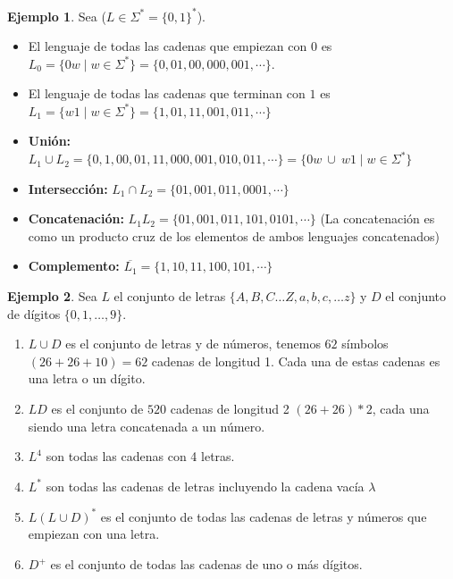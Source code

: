 \textbf{Ejemplo 1}. Sea ($L \in \Sigma^* = \{0,1\}^*$). 

\begin{itemize}
    \item El lenguaje de todas las cadenas que empiezan con $0$ es $L_0 = \{0w \mid w \in \Sigma^*\} = \{0,01,00, 000, 001, \cdots\}$.
    \item El lenguaje de todas las cadenas que terminan con $1$ es $L_1 = \{w1 \mid w \in \Sigma^*\} = \{1, 01, 11, 001, 011, \cdots\}$
\end{itemize}

\begin{itemize}
    \item \textbf{Unión:} $L_1 \cup L_2 = \{0,1,00, 01,11, 000, 001, 010, 011, \cdots\} = \{0w \ \cup \ w1 \mid w \in \Sigma^*\}$
    \item \textbf{Intersección:} $L_1 \cap L_2  = \{ 01, 001, 011, 0001, \cdots\} $
    \item \textbf{Concatenación:} $L_1L_2 = \{01,001,011,101,0101, \cdots\}$ (La concatenación es como un producto cruz de los elementos de ambos lenguajes concatenados)
    \item \textbf{Complemento:} $\overline{L_1} = \{1,10,11,100, 101, \cdots\}$
\end{itemize}
 
\textbf{Ejemplo 2}. Sea $L$ el conjunto de letras $\{A,B,C \dots Z, a,b,c, \dots z\}$ y $D$ el conjunto de dígitos $\{0,1, \dots , 9\}$.

\begin{enumerate}
    \item $L \cup D$ es el conjunto de letras y de números, tenemos $62$ símbolos $(26+26+10) = 62$ cadenas de longitud 1. Cada una de estas cadenas es una letra o un dígito. 
    \item $LD$ es el conjunto de $520$ cadenas de longitud 2 $(26 + 26)*2$, cada una siendo una letra concatenada a un número. 
    \item $L^4$ son todas las cadenas con 4 letras. 
    \item $L^*$ son todas las cadenas de letras incluyendo la cadena vacía $\lambda$
    \item $L(L \cup D)^*$ es el conjunto de todas las cadenas de letras y números que empiezan con una letra. 
    \item $D^{+}$ es el conjunto de todas las cadenas de uno o más dígitos.
\end{enumerate}

